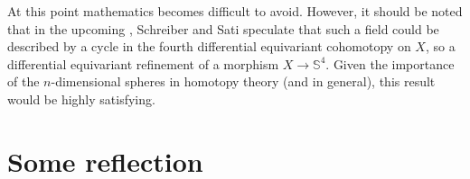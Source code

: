 \documentclass{article}
\begin{document}
At this point mathematics becomes difficult to avoid. However, it should be noted that in the upcoming \cite{SSS}, Schreiber and Sati speculate that such a field could be described by a cycle in the fourth differential equivariant cohomotopy on $X$, so a differential equivariant refinement of a morphism $X\rightarrow \mathbb{S}^4$. Given the importance of the $n$-dimensional spheres in homotopy theory (and in general), this result would be highly satisfying.













\section{Some reflection}
\end{document}
